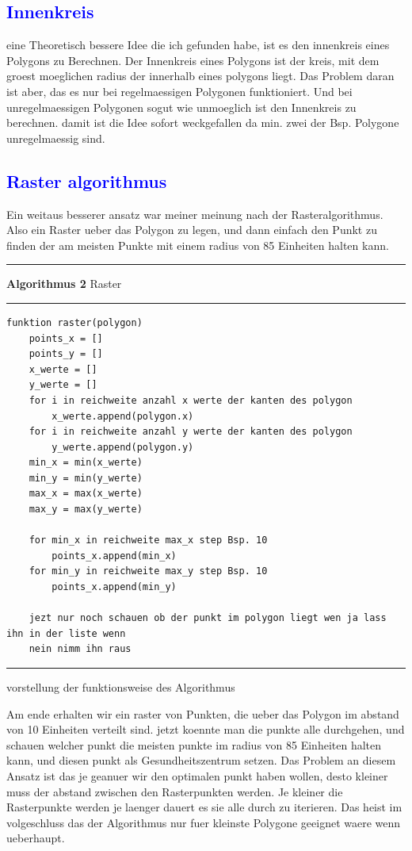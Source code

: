 \documentclass{article}
\begin{document}
\subsection{\textcolor{blue}{Innenkreis}}
eine Theoretisch bessere Idee die ich gefunden habe, ist es den innenkreis eines Polygons zu Berechnen. Der Innenkreis eines Polygons ist der kreis, mit dem groest moeglichen radius der innerhalb eines polygons liegt. Das Problem daran ist aber, das es nur bei regelmaessigen Polygonen funktioniert. Und bei unregelmaessigen Polygonen sogut wie unmoeglich ist den Innenkreis zu berechnen. damit ist die Idee sofort weckgefallen da min. zwei der Bsp. Polygone unregelmaessig sind.
\subsection{\textcolor{blue}{Raster algorithmus}}
Ein weitaus besserer ansatz war meiner meinung nach der Rasteralgorithmus. Also ein Raster ueber das Polygon zu legen, und dann einfach den Punkt zu finden der am meisten Punkte mit einem radius von 85 Einheiten halten kann.
\vspace{5pt}
\hrule
\vspace{1.5pt}
\large{\textbf{Algorithmus 2} Raster}
\vspace{1.5pt}
\hrule
\begin{verbatim}
funktion raster(polygon)
	points_x = []
	points_y = []
	x_werte = []
	y_werte = []
	for i in reichweite anzahl x werte der kanten des polygon
		x_werte.append(polygon.x)
	for i in reichweite anzahl y werte der kanten des polygon
		y_werte.append(polygon.y)
	min_x = min(x_werte)
	min_y = min(y_werte)
	max_x = max(x_werte)
	max_y = max(y_werte)
	
	for min_x in reichweite max_x step Bsp. 10
		points_x.append(min_x)
	for min_y in reichweite max_y step Bsp. 10
		points_x.append(min_y)
		
	jezt nur noch schauen ob der punkt im polygon liegt wen ja lass ihn in der liste wenn
	nein nimm ihn raus 
\end{verbatim}
\hrule
vorstellung der funktionsweise des Algorithmus\par
\vspace{5pt}
\raggedright 
Am ende erhalten wir ein raster von Punkten, die ueber das Polygon im abstand von 10 Einheiten verteilt sind. jetzt koennte man die punkte alle durchgehen, und schauen welcher punkt die meisten punkte im radius von 85 Einheiten halten kann, und diesen punkt als Gesundheitszentrum setzen. Das Problem an diesem Ansatz ist das je geanuer wir den optimalen punkt haben wollen, desto kleiner muss der abstand zwischen den Rasterpunkten werden. Je kleiner die Rasterpunkte werden je laenger dauert es sie alle durch zu iterieren. Das heist im volgeschluss das der Algorithmus nur fuer kleinste Polygone geeignet waere wenn ueberhaupt.
\end{document}
